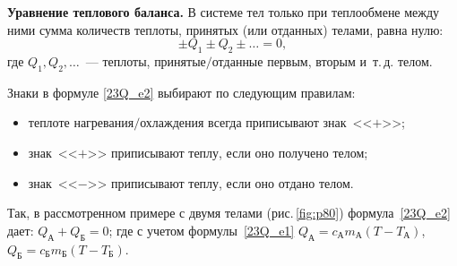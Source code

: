 \documentclass[main.tex]{subfiles}
\begin{document}
%
\begin{law}
    \textbf{Уравнение теплового баланса.} В системе тел только при теплообмене между ними сумма количеств теплоты, принятых (или отданных) телами, равна нулю:
    \begin{equation}
        \label{23Q_e2}
        \pm Q_1\pm Q_2\pm\ldots=0,
    \end{equation}
    где $Q_1,Q_2,\ldots$~--- теплоты, принятые$/$отданные первым, вторым и~т.\,д. телом.
\end{law}
%
Знаки в формуле \eqref{23Q_e2} выбирают по следующим правилам:
\begin{itemize}
    \item теплоте нагревания$/$охлаждения всегда приписывают знак~<<$+$>>; 
    \item знак~<<$+$>> приписывают теплу, если оно получено телом;
    \item знак~<<$-$>> приписывают теплу, если оно отдано телом.
\end{itemize}

Так, в рассмотренном примере с двумя телами (рис.\,\ref{fig:p80}) формула~\eqref{23Q_e2} дает:
$Q_\text{А}+Q_\text{Б}=0$; где с учетом формулы~\eqref{23Q_e1} $Q_\text{А}=c_\text{А}m_\text{А}(T-T_\text{А})$, $Q_\text{Б}=c_\text{Б}m_\text{Б}(T-T_\text{Б})$.




 
\end{document}
